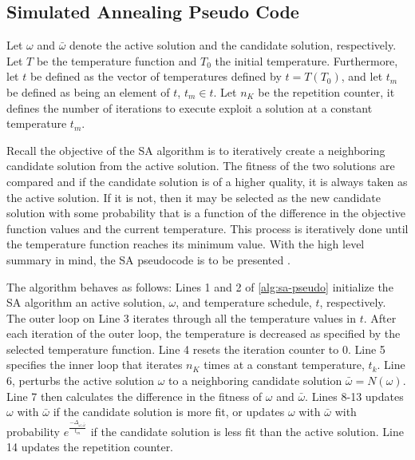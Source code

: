 \documentclass[11pt,a4paper,final]{article}
\newcommand{\Tau}{T}                        %
\begin{document}
\subsection{Simulated Annealing Pseudo Code}
\label{sec:simulated-annealing-pseudo-code}
Let \(\omega\) and \(\bar{\omega}\) denote the active solution and
the candidate solution, respectively. Let \(\Tau\) be the temperature function and \(\Tau_0\) the initial temperature.
Furthermore, let \(t\) be defined as the vector of temperatures defined by \(t = \Tau(\Tau_0)\), and let \(t_m\) be defined as
being an element of \(t\), \(t_m \in t\). Let \(n_K\) be the repetition counter, it defines the number of iterations to execute
exploit a solution at a constant temperature \(t_m\).

Recall the objective of the SA algorithm is to iteratively create a neighboring candidate solution from the active
solution. The fitness of the two solutions are compared and if the candidate solution is of a higher quality, it is
always taken as the active solution. If it is not, then it may be selected as the new candidate solution with some
probability that is a function of the difference in the objective function values and the current temperature. This
process is iteratively done until the temperature function reaches its minimum value. With the high level summary in
mind, the SA pseudocode is to be presented \cite{henderson-1989-theor-pract}.

The algorithm behaves as follows: Lines 1 and 2 of \ref{alg:sa-pseudo} initialize the SA algorithm an active solution,
\(\omega\), and temperature schedule, \(t\), respectively. The outer loop on Line 3 iterates through all the temperature values
in \(t\). After each iteration of the outer loop, the temperature is decreased as specified by the selected temperature
function. Line 4 resets the iteration counter to 0. Line 5 specifies the inner loop that iterates \(n_K\) times at a
constant temperature, \(t_k\). Line 6, perturbs the active solution \(\omega\) to a neighboring candidate solution \(\bar{\omega} =
N(\omega)\). Line 7 then calculates the difference in the fitness of \(\omega\) and \(\bar{\omega}\). Lines 8-13 updates \(\omega\) with \(\bar{\omega}\)
if the candidate solution is more fit, or updates \(\omega\) with \(\bar{\omega}\) with probability \(e^{\frac{-\Delta_{\omega , \bar{\omega}}}{t_m}}\)
if the candidate solution is less fit than the active solution. Line 14 updates the repetition counter.
\end{document}
